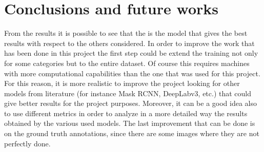 \documentclass[a4paper,10pt]{report}
\begin{document}
{\let\clearpage\relax\par \chapter{Conclusions and future works}\label{chap:conclusions}

From the results it is possible to see that the  is the model that gives the best results with respect to the others considered.
In order to improve the work that has been done in this project the first step could be extend the training not only for some categories but to the entire dataset. Of course this requires machines with more computational capabilities than the one that was used for this project. For this reason, it is more realistic to improve the project looking for other models from literature (for instance Mask RCNN, DeepLabv3, etc.)  that could give better results for the project purposes. Moreover, it can be a good idea also to use different metrics in order to analyze in a more detailed way the results obtained by the various used models.
The last improvement that can be done is on the ground truth annotations, since there are some images where they are not perfectly done.
}


\printbibliography
\end{document}
